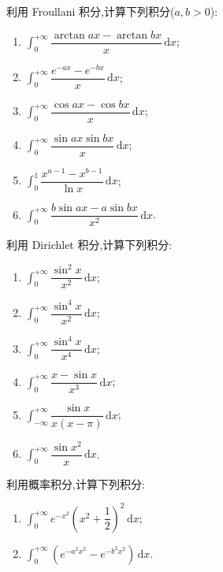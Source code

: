 \documentclass[../数学分析培优讲义.tex]{subfiles}
\begin{document}
\begin{example}
利用 Froullani 积分,计算下列积分($a,b>0$):
\begin{enumerate}[label=(\arabic*)]
    \item $\displaystyle\int_0^{+\infty}\dfrac{\arctan ax-\arctan bx}{x}\,\mathrm{d}x$;
    \item $\displaystyle\int_0^{+\infty}\dfrac{e^{-ax}-e^{-bx}}{x}\,\mathrm{d}x$;
    \item $\displaystyle\int_0^{+\infty}\dfrac{\cos ax-\cos bx}{x}\,\mathrm{d}x$;
    \item $\displaystyle\int_0^{+\infty}\dfrac{\sin ax\sin bx}{x}\,\mathrm{d}x$;
    \item $\displaystyle\int_0^1\dfrac{x^{a-1}-x^{b-1}}{\ln x}\,\mathrm{d}x$;
    \item $\displaystyle\int_0^{+\infty}\dfrac{b\sin ax-a\sin bx}{x^2}\,\mathrm{d}x$.
\end{enumerate}
\end{example}
\exampleblank

\begin{example}
利用 Dirichlet 积分,计算下列积分:
\begin{enumerate}[label=(\arabic*)]
    \item $\displaystyle\int_0^{+\infty}\dfrac{\sin^2x}{x^2}\,\mathrm{d}x$;
    \item $\displaystyle\int_0^{+\infty}\dfrac{\sin^4x}{x^2}\,\mathrm{d}x$;
    \item $\displaystyle\int_0^{+\infty}\dfrac{\sin^4x}{x^4}\,\mathrm{d}x$;
    \item $\displaystyle\int_0^{+\infty}\dfrac{x-\sin x}{x^3}\,\mathrm{d}x$;
    \item $\displaystyle\int_{-\infty}^{+\infty}\dfrac{\sin x}{x(x-\pi)}\,\mathrm{d}x$;
    \item $\displaystyle\int_0^{+\infty}\dfrac{\sin x^2}{x}\,\mathrm{d}x$.
\end{enumerate}
\end{example}
\exampleblank

\begin{example}
利用概率积分,计算下列积分:
\begin{enumerate}[label=(\arabic*)]
    \item $\displaystyle\int_0^{+\infty}e^{-x^2}\left(x^2+\dfrac{1}{2}\right)^2\,\mathrm{d}x$;
    \item $\displaystyle\int_0^{+\infty}\left(e^{-a^2x^2}-e^{-b^2x^2}\right)\,\mathrm{d}x$.
\end{enumerate}
\end{example}
\exampleblank
\end{document}
